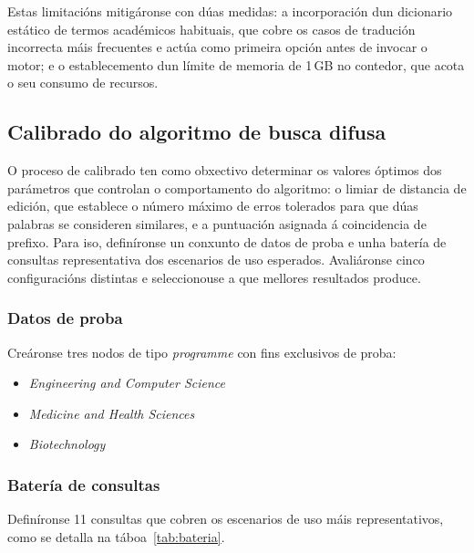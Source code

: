 \documentclass[%
    a4paper,               %
    twoside,               %
    10pt,                  %
]{article}                 %
\begin{document}
Estas limitacións mitigáronse con dúas medidas: a incorporación dun dicionario estático de termos académicos habituais, que cobre os casos de tradución incorrecta máis frecuentes e actúa como primeira opción antes de invocar o motor; e o establecemento dun límite de memoria de 1\,GB no contedor, que acota o seu consumo de recursos.

\subsection{Calibrado do algoritmo de busca difusa}
\label{anx:calibrado}

O proceso de calibrado ten como obxectivo determinar os valores óptimos dos parámetros que controlan o comportamento do algoritmo: o limiar de distancia de edición, que establece o número máximo de erros tolerados para que dúas palabras se consideren similares, e a puntuación asignada á coincidencia de prefixo. Para iso, definíronse un conxunto de datos de proba e unha batería de consultas representativa dos escenarios de uso esperados. Avaliáronse cinco configuracións distintas e seleccionouse a que mellores resultados produce.

\subsubsection{Datos de proba}

Creáronse tres nodos de tipo \textit{programme} con fins exclusivos de proba:
\begin{itemize}
    \item \textit{Engineering and Computer Science}
    \item \textit{Medicine and Health Sciences}
    \item \textit{Biotechnology}
\end{itemize}

\subsubsection{Batería de consultas}

Definíronse 11 consultas que cobren os escenarios de uso máis representativos, como se detalla na táboa~\ref{tab:bateria}.
\end{document}
